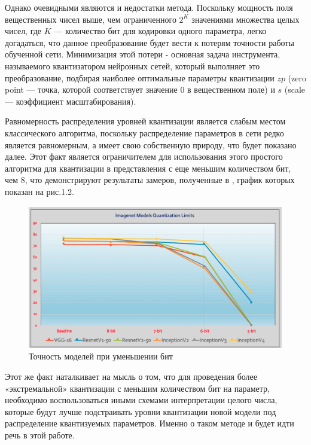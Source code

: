 Однако очевидными являются и недостатки метода. Поскольку мощность поля вещественных чисел выше, чем ограниченного $2^K$ значениями множества целых чисел, где $K$ — количество бит для кодировки одного параметра,  легко догадаться, что данное преобразование будет вести к потерям точности работы обученной сети. Минимизация этой потери - основная задача инструмента, называемого квантизатором нейронных сетей, который выполняет это преобразование, подбирая наиболее оптимальные параметры квантизации $zp$ (zero point — точка, которой соответствует значение $0$ в вещественном поле) и $s$ (scale — коэффициент масштабирования). 

Равномерность распределения уровней квантизации является слабым местом классического алгоритма, поскольку распределение параметров в сети редко является равномерным, а имеет свою собственную природу, что будет показано далее. Этот факт является ограничителем для использования этого простого алгоритма для квантизации в представления с еще меньшим количеством бит, чем $8$, что демонстрируют результаты замеров, полученные в \cite{lq}, график которых показан на рис.1.2.

\begin{figure}[H]
    \begin{center}
        \includegraphics[scale=0.3]{tex/inc/img/q8stat.jpg}
        \caption{Точность моделей при уменьшении бит}
    \end{center}
\end{figure}

Этот же факт наталкивает на мысль о том, что для проведения более «экстремальной» квантизации с меньшим количеством бит на параметр, необходимо воспользоваться иными схемами интерпретации целого числа, которые будут лучше подстраивать уровни квантизации новой модели под распределение квантизуемых параметров. Именно о таком методе и будет идти речь в этой работе.

